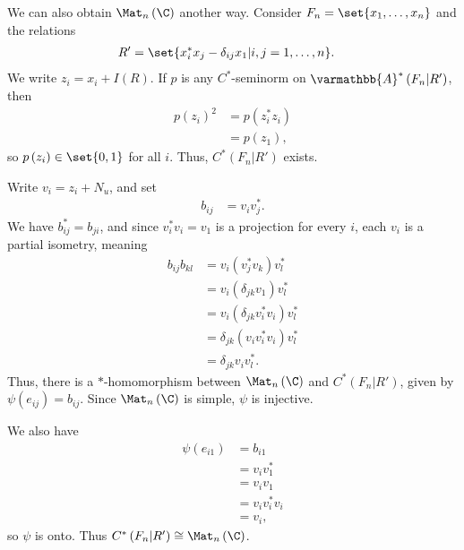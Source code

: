 \documentclass[10pt]{mypackage}
\renewcommand*{\mathbb}[1]{\varmathbb{#1}}
\newcommand{\A}{\mathbb{A}}
\begin{document}
\begin{example}
  We can also obtain $\Mat_n\left(\C\right)$ another way. Consider $F_n = \set{x_1,\dots,x_n}$ and the relations
  \begin{align*}
    R' &= \set{x_{i}^{\ast}x_j - \delta_{ij}x_1 | i,j=1,\dots,n}.
  \end{align*}
  We write $z_i = x_i + I(R)$. If $p$ is any $C^{\ast}$-seminorm on $\A^{\ast}\left(F_n|R'\right)$, then
  \begin{align*}
    p\left(z_i\right)^2 &= p\left(z_i^{\ast}z_i\right)\\
                        &= p\left(z_1\right),
  \end{align*}
  so $p\left(z_i\right)\in \set{0,1}$ for all $i$. Thus, $C^{\ast}\left(F_n|R'\right)$ exists.\newline

  Write $v_i =z_i + N_u$, and set
  \begin{align*}
    b_{ij} &= v_iv_j^{\ast}.
  \end{align*}
  We have $b_{ij}^{\ast} = b_{ji}$, and since $v_i^{\ast}v_i = v_1$ is a projection for every $i$, each $v_i$ is a partial isometry, meaning
  \begin{align*}
    b_{ij}b_{kl} &= v_{i}\left(v_j^{\ast}v_k\right)v_l^{\ast}\\
                 &= v_i\left(\delta_{jk}v_1\right)v_l^{\ast}\\
                 &= v_i\left(\delta_{jk}v_i^{\ast}v_i\right)v_l^{\ast}\\
                 &= \delta_{jk}\left(v_iv_i^{\ast}v_i\right)v_l^{\ast}\\
                 &= \delta_{jk}v_iv_l^{\ast}.
  \end{align*}
  Thus, there is a $\ast$-homomorphism between $\Mat_n\left(\C\right)$ and $C^{\ast}\left(F_n|R'\right)$, given by $\psi\left(e_{ij}\right) = b_{ij}$. Since $\Mat_n\left(\C\right)$ is simple, $\psi$ is injective.\newline

  We also have
  \begin{align*}
    \psi\left(e_{i1}\right) &= b_{i1}\\
                            &= v_iv_1^{\ast}\\
                            &= v_iv_1\\
                            &= v_iv_i^{\ast}v_i\\
                            &= v_i,
  \end{align*}
  so $\psi$ is onto. Thus $C^{\ast}\left(F_n|R'\right)\cong \Mat_n\left(\C\right)$.
\end{example}
\end{document}
